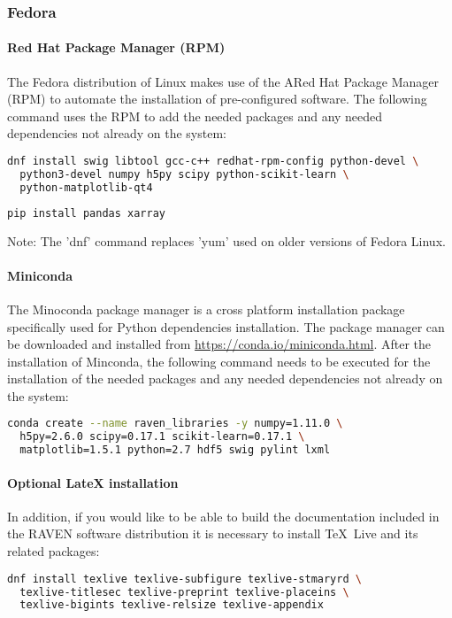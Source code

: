 \goToRavenInstallation

\subsubsection{Fedora}

\paragraph{Red Hat Package Manager (RPM)}
The Fedora distribution of Linux makes use of the ARed Hat Package Manager (RPM)
to automate the installation of pre-configured software. The
following command uses the RPM to add the needed packages and any
needed dependencies not already on the system:

\begin{lstlisting}[language=bash]
dnf install swig libtool gcc-c++ redhat-rpm-config python-devel \
  python3-devel numpy h5py scipy python-scikit-learn \
  python-matplotlib-qt4
\end{lstlisting}
\begin{lstlisting}[language=bash]
pip install pandas xarray
\end{lstlisting}

Note: The 'dnf' command replaces 'yum' used on older versions of
Fedora Linux.

\paragraph{Miniconda}
The Minoconda package manager is a cross platform installation package specifically
used for Python dependencies installation.
The package manager can be downloaded and installed from \url{https://conda.io/miniconda.html}.
After the installation of Minconda, the following command needs to be executed for the installation of
the needed packages and any needed dependencies not already on the system:

\begin{lstlisting}[language=bash]
 conda create --name raven_libraries -y numpy=1.11.0 \
  h5py=2.6.0 scipy=0.17.1 scikit-learn=0.17.1 \
  matplotlib=1.5.1 python=2.7 hdf5 swig pylint lxml
\end{lstlisting}

\paragraph{Optional LateX installation}
In addition, if you would like to be able to build the documentation
included in the RAVEN software distribution it is necessary to install
\TeX~Live and its related packages:
\begin{lstlisting}[language=bash]
dnf install texlive texlive-subfigure texlive-stmaryrd \
  texlive-titlesec texlive-preprint texlive-placeins \
  texlive-bigints texlive-relsize texlive-appendix
\end{lstlisting}

